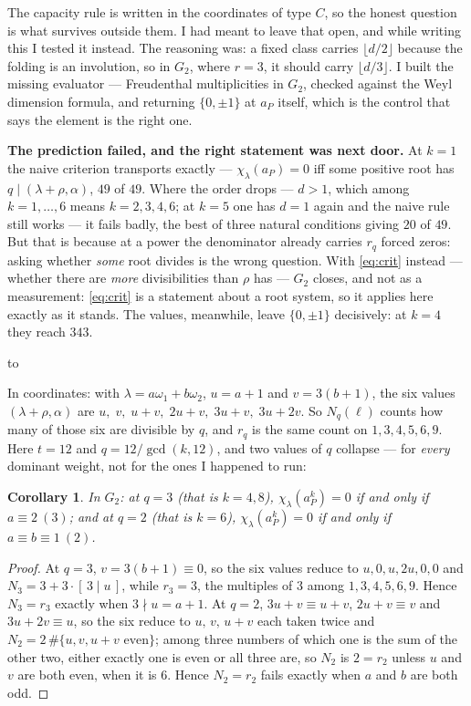 \documentclass[11pt,a4paper]{article}
\newtheorem{corollary}[theorem]{Corollary}
\theoremstyle{definition}
\newenvironment{keybox}
  {\par\vspace{9pt}\begin{lrbox}{\fichabox}%
   \begin{minipage}{0.90\textwidth}\vspace{7pt}\setlength{\parskip}{3pt}}
  {\vspace{7pt}\end{minipage}\end{lrbox}%
   \par\noindent\hbox to \textwidth{\hfill
   \textcolor{azul}{\rule[-\dp\fichabox]{3.2pt}{\dimexpr\ht\fichabox+\dp\fichabox\relax}}%
   \colorbox{fondoficha}{\usebox{\fichabox}}\hfill}%
   \par\vspace{9pt}}
\begin{document}
The capacity rule is written in the coordinates of type $C$, so the honest question is what
survives outside them. I had meant to leave that open, and while writing this I tested it instead.
The reasoning was: a fixed class carries $\lfloor d/2\rfloor$ because the folding is an involution,
so in $G_2$, where $r=3$, it should carry $\lfloor d/3\rfloor$. I built the missing evaluator ---
Freudenthal multiplicities in $G_2$, checked against the Weyl dimension formula, and returning
$\{0,\pm1\}$ at $a_P$ itself, which is the control that says the element is the right one.

\begin{keybox}
\textbf{The prediction failed, and the right statement was next door.} At $k=1$ the naive criterion
transports exactly --- $\chi_\lambda(a_P)=0$ iff some positive root has $q\mid(\lambda+\rho,\alpha)$,
$49$ of $49$. Where the order drops --- $d>1$, which among $k=1,\dots,6$ means $k=2,3,4,6$; at
$k=5$ one has $d=1$ again and the naive rule still works --- it fails badly, the best of three
natural conditions giving $20$ of $49$.
But that is because at a power the denominator already carries $r_q$ forced zeros: asking whether
\emph{some} root divides is the wrong question. With \eqref{eq:crit} instead --- whether there are
\emph{more} divisibilities than $\rho$ has --- $G_2$ closes, and not as a measurement:
\eqref{eq:crit} is a statement about a root system, so it applies here exactly as it stands. The
values, meanwhile, leave $\{0,\pm1\}$ decisively: at $k=4$ they reach $343$.
\end{keybox}

\noindent In coordinates: with $\lambda=a\omega_1+b\omega_2$, $u=a+1$ and $v=3(b+1)$, the six values
$(\lambda+\rho,\alpha)$ are $u,\;v,\;u+v,\;2u+v,\;3u+v,\;3u+2v$. So $N_q(\ell)$ counts how many
of those six are divisible by $q$, and $r_q$ is the same count on $1,3,4,5,6,9$. Here $t=12$ and
$q=12/\gcd(k,12)$, and two values of $q$ collapse --- for \emph{every} dominant weight, not for the
ones I happened to run:

\begin{corollary}\label{cor:g2}
In $G_2$: at $q=3$ (that is $k=4,8$), $\chi_\lambda(a_P^k)=0$ if and only if $a\equiv2\ (3)$; and at
$q=2$ (that is $k=6$), $\chi_\lambda(a_P^k)=0$ if and only if $a\equiv b\equiv1\ (2)$.
\end{corollary}

\begin{proof}
At $q=3$, $v=3(b+1)\equiv0$, so the six values reduce to $u,0,u,2u,0,0$ and
$N_3=3+3\cdot[\,3\mid u\,]$, while $r_3=3$, the multiples of $3$ among $1,3,4,5,6,9$. Hence
$N_3=r_3$ exactly when $3\nmid u=a+1$. At $q=2$, $3u+v\equiv u+v$, $2u+v\equiv v$ and
$3u+2v\equiv u$, so the six reduce to $u,\,v,\,u+v$ each taken twice and
$N_2=2\,\#\{u,v,u+v \text{ even}\}$; among three numbers of which one is the sum of the other two,
either exactly one is even or all three are, so $N_2$ is $2=r_2$ unless $u$ and $v$ are both even,
when it is $6$. Hence $N_2=r_2$ fails exactly when $a$ and $b$ are both odd.
\end{proof}
\end{document}
